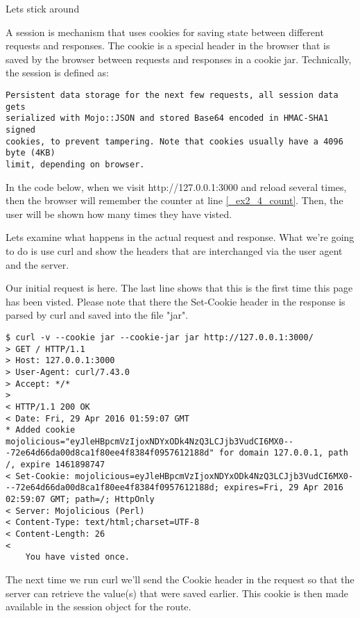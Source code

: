 \documentclass[14pt]{extreport}
\begin{document}
{\Large Lets stick around}

A session is mechanism that uses cookies for saving state between different
requests and responses.  The cookie is a special header in the browser that is
saved by the browser between requests and responses in a cookie jar.  Technically,
the session is defined as:

\begin{lstlisting}[style=BlockStyle]
Persistent data storage for the next few requests, all session data gets
serialized with Mojo::JSON and stored Base64 encoded in HMAC-SHA1 signed
cookies, to prevent tampering. Note that cookies usually have a 4096 byte (4KB)
limit, depending on browser.
\end{lstlisting}

In the code below, when we visit http://127.0.0.1:3000 and reload several
times, then the browser will remember the counter at line \ref{_ex2_4_count}.  
Then, the user will be shown how many times they have visted.



Lets examine what happens in the actual request and response.  What we're going
to do is use curl and show the headers that are interchanged via the user agent
and the server.

Our initial request is here.  The last line shows that this is the first time this
page has been visted.  Please note that there the Set-Cookie header in the response
is parsed by curl and saved into the file "jar".

\begin{lstlisting}[style=BashOutputStyle]
$ curl -v --cookie jar --cookie-jar jar http://127.0.0.1:3000/
> GET / HTTP/1.1
> Host: 127.0.0.1:3000
> User-Agent: curl/7.43.0
> Accept: */*
> 
< HTTP/1.1 200 OK
< Date: Fri, 29 Apr 2016 01:59:07 GMT
* Added cookie mojolicious="eyJleHBpcmVzIjoxNDYxODk4NzQ3LCJjb3VudCI6MX0---72e64d66da00d8ca1f80ee4f8384f0957612188d" for domain 127.0.0.1, path /, expire 1461898747
< Set-Cookie: mojolicious=eyJleHBpcmVzIjoxNDYxODk4NzQ3LCJjb3VudCI6MX0---72e64d66da00d8ca1f80ee4f8384f0957612188d; expires=Fri, 29 Apr 2016 02:59:07 GMT; path=/; HttpOnly
< Server: Mojolicious (Perl)
< Content-Type: text/html;charset=UTF-8
< Content-Length: 26
< 
    You have visted once.
\end{lstlisting}

The next time we run curl we'll send the Cookie header in the request so that the server
can retrieve the value(s) that were saved earlier.  This cookie is then made available in the
session object for the route.
\end{document}
